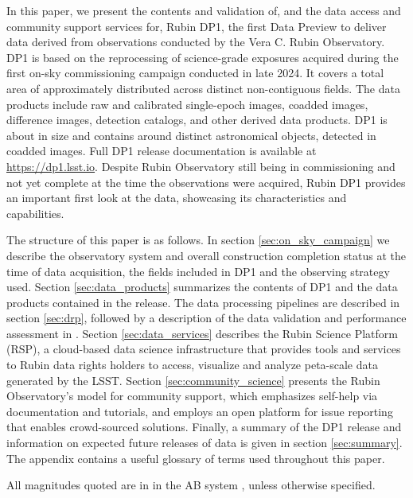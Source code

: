 In this paper, we present the contents and validation of, and the data access and community support services for, Rubin \gls{DP1}, the first Data Preview to deliver data derived from observations conducted by the Vera C. Rubin Observatory.
\gls{DP1} is based on the reprocessing of \nexposures science-grade exposures acquired 
during the first on-sky commissioning campaign conducted in late 2024.
It covers a  total area of approximately \totalarea distributed across \nfields distinct non-contiguous fields.
The data products include raw and calibrated single-\gls{epoch} images, coadded images, difference images, detection catalogs, and other derived data products.
\gls{DP1} is about \sizeinbytes in size and contains around \nobjects distinct astronomical objects, detected in \ndeepcoadds coadded images.
Full \gls{DP1} release documentation is available at \url{https://dp1.lsst.io}.
Despite Rubin Observatory still being in commissioning and not yet complete at the time the observations were acquired, Rubin \gls{DP1} provides an important first look at the data, showcasing its characteristics and capabilities.

The structure of this paper is as follows.
In section \ref{sec:on_sky_campaign} we describe the observatory system and overall construction completion status at the time of data acquisition, the \nfields fields included in \gls{DP1} and the observing strategy used.
Section \ref{sec:data_products} summarizes the contents of \gls{DP1} and the data products contained in the release.
The data processing pipelines are described in section \ref{sec:drp}, followed by a description of the data validation and performance assessment in .
Section \ref{sec:data_services} describes the Rubin \gls{Science Platform} (RSP), a \gls{cloud}-based data science infrastructure that provides tools and services to Rubin data rights holders to access, visualize and analyze peta-scale data generated by the \gls{LSST}.
Section \ref{sec:community_science} presents the Rubin Observatory's model for community support, which emphasizes self-help via documentation and tutorials, and employs an open platform for issue reporting that enables crowd-sourced solutions.
Finally, a summary of the \gls{DP1} release and information on expected future releases of data is given in section \ref{sec:summary}.
The appendix contains a useful glossary of terms used throughout this paper.

All magnitudes quoted are in
in the AB system \citep{1983ApJ...266..713O}, unless otherwise specified.